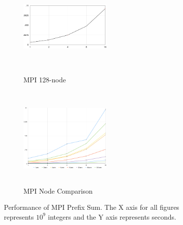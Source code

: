 \documentclass[11pt]{article}
\begin{document}
\begin{figure}[ht]
\begin{subfigure}[h!]{0.3\textwidth}
        \centering
        \includegraphics[width=4.5cm,height=5cm,keepaspectratio]{m128}
        \caption{MPI 128-node}
    \end{subfigure}
    \hfill
    \begin{subfigure}[h!]{0.3\textwidth}
        \centering
        \includegraphics[width=4.5cm,height=5cm,keepaspectratio]{MPI_Comp}
        \caption{MPI Node Comparison}
    \end{subfigure}
    \hfill
    \caption{Performance of MPI Prefix Sum. The X axis for all figures represents $10^{9}$ integers and the Y axis represents seconds.}
\end{figure}
\end{document}
